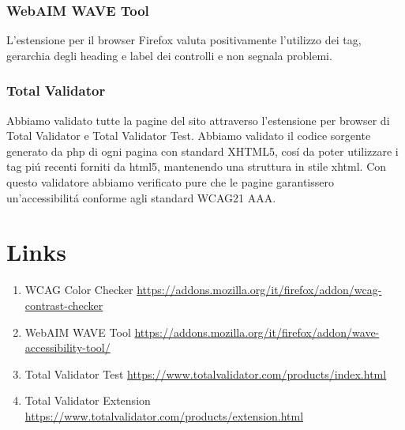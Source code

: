\subsubsection{WebAIM WAVE Tool}
L'estensione per il browser Firefox valuta positivamente l'utilizzo dei tag, gerarchia degli heading e label dei controlli e non segnala problemi.

\subsubsection{Total Validator}
Abbiamo validato tutte la pagine del sito attraverso l'estensione per browser di Total Validator e Total Validator Test. Abbiamo validato il codice sorgente generato da php di ogni pagina con standard XHTML5, cosí da poter utilizzare i tag piú recenti forniti da html5, mantenendo una struttura in stile xhtml. Con questo validatore abbiamo verificato pure che le pagine garantissero un'accessibilitá conforme agli standard WCAG21 AAA.


\vfill
\section*{Links}
\begin{enumerate}
	\item WCAG Color Checker \url{https://addons.mozilla.org/it/firefox/addon/wcag-contrast-checker} 
    \item WebAIM WAVE Tool \url{https://addons.mozilla.org/it/firefox/addon/wave-accessibility-tool/} 
    \item Total Validator Test \url{https://www.totalvalidator.com/products/index.html}
    \item Total Validator Extension \url{https://www.totalvalidator.com/products/extension.html}
\end{enumerate}
    